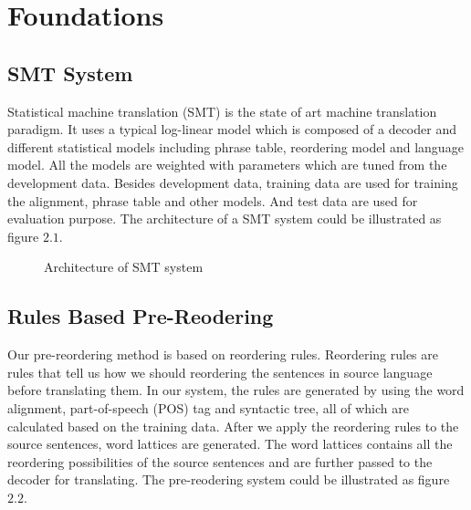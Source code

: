 
\chapter{Foundations}
\label{ch:Foundations}



\section{SMT System}
\label{ch:Foundations:sec:SMTSystem}


Statistical machine translation (SMT) is the state of art machine translation paradigm. It uses a typical log-linear model which is composed of a decoder and different statistical models including phrase table, reordering model and language model. All the models are weighted with parameters which are tuned from the development data. Besides development data, training data are used for training the alignment, phrase table and other models. And test data are used for evaluation purpose. The architecture of a SMT system could be illustrated as figure $2.1$.

\begin{figure}[H]
\centering

\caption{Architecture of SMT system}
\end{figure}

\section{Rules Based Pre-Reodering}
\label{ch:Foundations:sec:PreReorderingSystem}

Our pre-reordering method is based on reordering rules. Reordering rules are rules that tell us how we should reordering the sentences in source language before translating them. In our system, the rules are generated by using the word alignment, part-of-speech (POS) tag and syntactic tree, all of which are calculated based on the training data. After we apply the reordering rules to the source sentences, word lattices are generated. The word lattices contains all the reordering possibilities of the source sentences and are further passed to the decoder for translating. The pre-reodering system could be illustrated as figure $2.2$.

